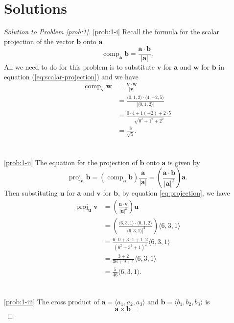 \documentclass[12pt]{article}
\theoremstyle{plain}
\theoremstyle{definition}
\theoremstyle{remark}
\DeclareMathOperator{\proj}{proj}
\DeclareMathOperator{\comp}{comp}
\newcommand{\bfa}{\mathbf{a}}
\newcommand{\bfb}{\mathbf{b}}
\newcommand{\bfu}{\mathbf{u}}
\newcommand{\bfv}{\mathbf{v}}
\newcommand{\bfw}{\mathbf{w}}
\begin{document}
\section*{Solutions}
\begin{proof}[Solution to Problem \ref{prob:1}]
\ref{prob:1-i} Recall the formula for the scalar projection of the vector
$\bfb$ onto $\bfa$
\begin{equation}
\label{eq:scalar-projection}
\comp_{\bfa}\bfb=\frac{\bfa\cdot\bfb}{|\bfa|}.
\end{equation}
All we need to do for this problem is to substitute $\bfv$ for $\bfa$ and
$\bfw$ for $\bfb$ in equation (\ref{eq:scalar-projection}) and we have
\begin{align*}
\comp_{\bfv}\bfw
&=\frac{\bfv\cdot\bfw}{|\bfv|}\\
&=\frac{\langle 0,1,2\rangle\cdot\langle
  4,-2,5\rangle}{\left|\langle 0,1,2\rangle\right|}\\
&=\frac{0\cdot 4+1(-2)+2\cdot 5}{\sqrt{0^2+1^2+2^2}}\\
&=\boxed{\frac{8}{\sqrt{5}}.}
\end{align*}
\\\\
\ref{prob:1-ii} The equation for the projection of $\bfb$ onto $\bfa$ is
given by
\begin{equation}
  \label{eq:projection}
\proj_{\bfa}\bfb=
\left(\comp_{\bfa}\bfb\right)\frac{\bfa}{|\bfa|}=
\left(\frac{\bfa\cdot\bfb}{|\bfa|^2}\right)\bfa.
\end{equation}
Then substituting $\bfu$ for $\bfa$ and $\bfv$ for $\bfb$, by equation
\ref{eq:projection}, we have
\begin{align*}
\proj_{\bfu}\bfv&=
\left(\frac{\bfu\cdot\bfv}{|\bfu|^2}\right)\bfu\\
&=\left(\frac{\langle 6,3,1\rangle\cdot\langle 0,1,2\rangle}
{\left|\langle 6,3,1\rangle\right|^2}\right)\langle 6,3,1\rangle\\
&=\frac{6\cdot 0+3\cdot 1+1\cdot 2}{\left(6^2+3^2+1\right)^2}\langle
  6,3,1\rangle\\
&=\frac{3+2}{36+9+1}\langle 6,3,1\rangle\\
&=\boxed{\frac{5}{46}\langle 6,3,1\rangle.}
\end{align*}
\\\\
\ref{prob:1-iii} The cross product of $\bfa=\langle a_1,a_2,a_3\rangle$ and
$\bfb=\langle b_1,b_2,b_3\rangle$ is
\begin{equation}
\label{eq:cross-product}
\bfa\times\bfb=

\end{equation}
\end{proof}
\end{document}

